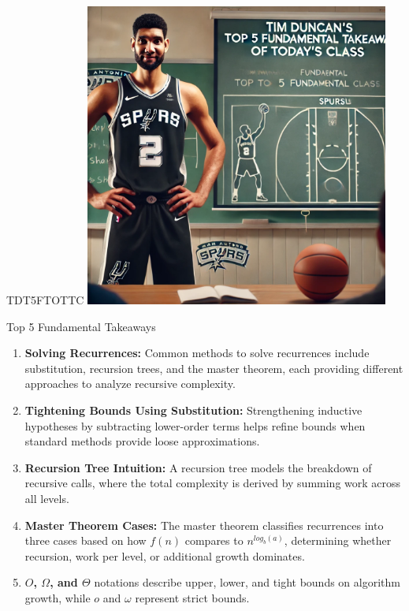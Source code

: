 \documentclass{beamer}
\begin{document}
\begin{frame}{TDT5FTOTTC}
    \centering
    \includegraphics[width=0.75\textwidth]{figures/tim.png}
\end{frame}

\begin{frame}{Top 5 Fundamental Takeaways}
    \small
    \begin{enumerate} \pause
        \item[5] \textbf{Solving Recurrences:} Common methods to solve recurrences include substitution, recursion trees, and the master theorem, each providing different approaches to analyze recursive complexity. \pause

        \item[4] \textbf{Tightening Bounds Using Substitution:} Strengthening inductive hypotheses by subtracting lower-order terms helps refine bounds when standard methods provide loose approximations. \pause

        \item[3] \textbf{Recursion Tree Intuition:} A recursion tree models the breakdown of recursive calls, where the total complexity is derived by summing work across all levels. \pause

        \item[2] \textbf{Master Theorem Cases:} The master theorem classifies recurrences into three cases based on how $f(n)$ compares to $n^{log_b(a)}$, determining whether recursion, work per level, or additional growth dominates. \pause

        \item[1] \textbf{$O$, $\Omega$, and $\Theta$} notations describe upper, lower, and tight bounds on algorithm growth, while $o$ and $\omega$ represent strict bounds. \pause

    \end{enumerate}
\end{frame}
\end{document}
